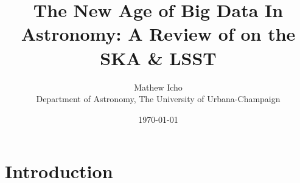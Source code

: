 \documentclass[12pt,a4paper]{article}
\title{The New Age of Big Data In Astronomy: A Review of on the SKA \& LSST}
\author{Mathew Icho \\ \small Department of Astronomy, The University of Urbana-Champaign}
\date{\today}
\begin{document}
\maketitle

\begin{abstract}

\end{abstract}

\section{Introduction}
\end{document}
